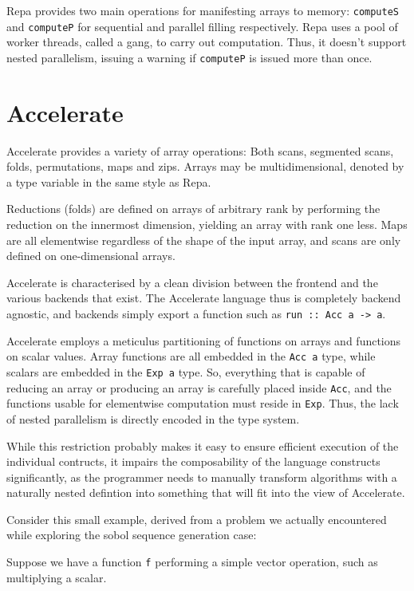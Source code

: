 Repa provides two main operations for manifesting arrays to memory:
\texttt{computeS} and \texttt{computeP} for sequential and parallel filling
respectively. Repa uses a pool of worker threads, called a gang, to carry out
computation. Thus, it doesn't support nested parallelism, issuing a warning if
\texttt{computeP} is issued more than once.

\section{Accelerate}

Accelerate provides a variety of array operations: Both scans, segmented scans,
folds, permutations, maps and zips. Arrays may be multidimensional, denoted by
a type variable in the same style as Repa.

Reductions (folds) are defined on arrays of arbitrary rank by performing the
reduction on the innermost dimension, yielding an array with rank one less.
Maps are all elementwise regardless of the shape of the input array, and scans
are only defined on one-dimensional arrays.

Accelerate is characterised by a clean division between the frontend and the
various backends that exist. The Accelerate language thus is completely backend
agnostic, and backends simply export a function such as \hbox{\texttt{run :: Acc a ->
a}.}

Accelerate employs a meticulus partitioning of functions on arrays and functions
on scalar values. Array functions are all embedded in the \texttt{Acc a} type,
while scalars are embedded in the \texttt{Exp a} type. So, everything that is
capable of reducing an array or producing an array is carefully placed inside
\texttt{Acc}, and the functions usable for elementwise computation must
reside in \texttt{Exp}. Thus, the lack of nested parallelism is directly
encoded in the type system.

While this restriction probably makes it easy to ensure efficient execution of
the individual contructs, it impairs the composability of the language
constructs significantly, as the programmer needs to manually transform
algorithms with a naturally nested defintion into something that will fit into
the view of Accelerate.

Consider this small example, derived from a problem we actually encountered
while exploring the sobol sequence generation case:

Suppose we have a function \texttt{f} performing a simple vector operation,
such as multiplying a scalar.

